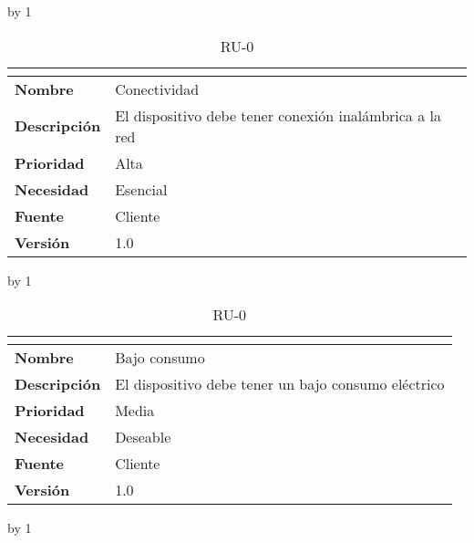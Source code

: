 \advance\ru by 1
\begin{table}[H]
	\caption{RU-0\number\ru}
	\begin{tabular}{|l|p{}|}
		\hline
		\multicolumn{2}{|c|}{\cellcolor[HTML]{BFBFBF}{\color[HTML]{000000} \textbf{RU-0\number\ru}}} \\ \hline
		\textbf{Nombre}      & Conectividad                                            \\ \hline
		\textbf{Descripción} & El dispositivo debe tener conexión inalámbrica a la red \\ \hline
		\textbf{Prioridad}   & Alta                                                    \\ \hline
		\textbf{Necesidad}   & Esencial                                                \\ \hline
		\textbf{Fuente}      & Cliente                                                 \\ \hline
		\textbf{Versión}     & 1.0                                                     \\ \hline
	\end{tabular}
\end{table}
\advance\ru by 1
\begin{table}[H]
	\caption{RU-0\number\ru}
	\begin{tabular}{|l|p{}|}
		\hline
		\multicolumn{2}{|c|}{\cellcolor[HTML]{BFBFBF}{\color[HTML]{000000} \textbf{RU-0\number\ru}}} \\ \hline
		\textbf{Nombre}      & Bajo consumo                                        \\ \hline
		\textbf{Descripción} & El dispositivo debe tener un bajo consumo eléctrico \\ \hline
		\textbf{Prioridad}   & Media                                               \\ \hline
		\textbf{Necesidad}   & Deseable                                            \\ \hline
		\textbf{Fuente}      & Cliente                                             \\ \hline
		\textbf{Versión}     & 1.0                                                 \\ \hline
	\end{tabular}
\end{table}
\advance\ru by 1
